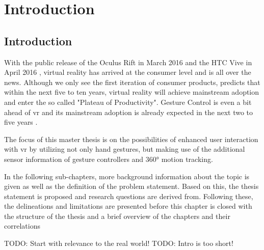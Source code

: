 
\chapter{Introduction} %

\label{ChapterIntroduction} %


\section{Introduction}

With the public release of the Oculus Rift in March 2016 \citep{Oculus2016} and the HTC Vive in April 2016 \citep{Htcvive2016}, virtual reality has arrived at the consumer level and is all over the news. Although we only see the first iteration of consumer products, \cite{Gartner2015} predicts that within the next five to ten years, virtual reality will achieve mainstream adoption and enter the so called "Plateau of Productivity". Gesture Control is even a bit ahead of \gls{vr} and its mainstream adoption is already expected in the next two to five years \citep{Gartner2015}.

The focus of this master thesis is on the possibilities of enhanced user interaction with \gls{vr} by utilizing not only hand gestures, but making use of the additional sensor information of gesture controllers and 360° motion tracking.

In the following sub-chapters, more background information about the topic is given as well as the definition of the problem statement. Based on this, the thesis statement is proposed and research questions are derived from. Following these, the delineations and limitations are presented before this chapter is closed with the structure of the thesis and a brief overview of the chapters and their correlations

TODO: Start with relevance to the real world!
TODO: Intro is too short!




